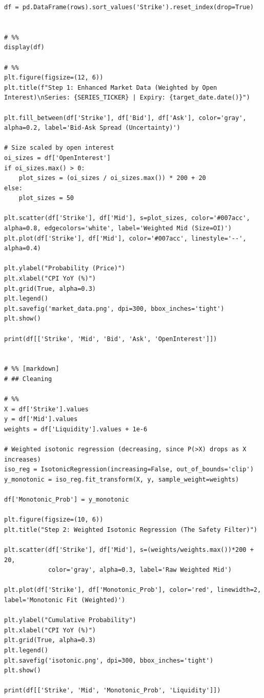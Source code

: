 \documentclass[11pt]{article}
\begin{document}
\begin{lstlisting}
df = pd.DataFrame(rows).sort_values('Strike').reset_index(drop=True)


# %%
display(df)

# %%
plt.figure(figsize=(12, 6))
plt.title(f"Step 1: Enhanced Market Data (Weighted by Open Interest)\nSeries: {SERIES_TICKER} | Expiry: {target_date.date()}")

plt.fill_between(df['Strike'], df['Bid'], df['Ask'], color='gray', alpha=0.2, label='Bid-Ask Spread (Uncertainty)')

# Size scaled by open interest
oi_sizes = df['OpenInterest']
if oi_sizes.max() > 0:
    plot_sizes = (oi_sizes / oi_sizes.max()) * 200 + 20
else:
    plot_sizes = 50

plt.scatter(df['Strike'], df['Mid'], s=plot_sizes, color='#007acc', alpha=0.8, edgecolors='white', label='Weighted Mid (Size=OI)')
plt.plot(df['Strike'], df['Mid'], color='#007acc', linestyle='--', alpha=0.4)

plt.ylabel("Probability (Price)")
plt.xlabel("CPI YoY (%)")
plt.grid(True, alpha=0.3)
plt.legend()
plt.savefig('market_data.png', dpi=300, bbox_inches='tight')
plt.show()

print(df[['Strike', 'Mid', 'Bid', 'Ask', 'OpenInterest']])


# %% [markdown]
# ## Cleaning

# %%
X = df['Strike'].values
y = df['Mid'].values
weights = df['Liquidity'].values + 1e-6

# Weighted isotonic regression (decreasing, since P(>X) drops as X increases)
iso_reg = IsotonicRegression(increasing=False, out_of_bounds='clip')
y_monotonic = iso_reg.fit_transform(X, y, sample_weight=weights)

df['Monotonic_Prob'] = y_monotonic

plt.figure(figsize=(10, 6))
plt.title("Step 2: Weighted Isotonic Regression (The Safety Filter)")

plt.scatter(df['Strike'], df['Mid'], s=(weights/weights.max())*200 + 20, 
            color='gray', alpha=0.3, label='Raw Weighted Mid')

plt.plot(df['Strike'], df['Monotonic_Prob'], color='red', linewidth=2, label='Monotonic Fit (Weighted)')

plt.ylabel("Cumulative Probability")
plt.xlabel("CPI YoY (%)")
plt.grid(True, alpha=0.3)
plt.legend()
plt.savefig('isotonic.png', dpi=300, bbox_inches='tight')
plt.show()

print(df[['Strike', 'Mid', 'Monotonic_Prob', 'Liquidity']])



\end{lstlisting}
\end{document}
